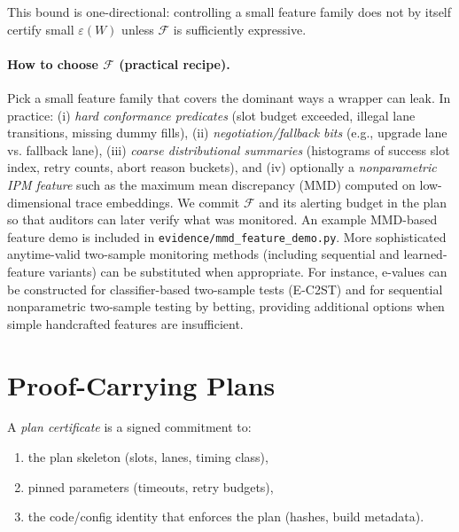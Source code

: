 \documentclass[11pt]{article}
\begin{document}
This bound is one-directional: controlling a small feature family does not by itself certify small $\varepsilon(W)$ unless $\mathcal{F}$ is sufficiently expressive.

\paragraph{How to choose $\mathcal{F}$ (practical recipe).}
Pick a small feature family that covers the dominant ways a wrapper can leak.
In practice: (i) \emph{hard conformance predicates} (slot budget exceeded, illegal lane transitions, missing dummy fills),
(ii) \emph{negotiation/fallback bits} (e.g., upgrade lane vs. fallback lane),
(iii) \emph{coarse distributional summaries} (histograms of success slot index, retry counts, abort reason buckets),
and (iv) optionally a \emph{nonparametric IPM feature} such as the maximum mean discrepancy (MMD) computed on low-dimensional trace embeddings.\cite{grettonKernelTwoSample2012,sriperumbudurIPM2012}
We commit $\mathcal{F}$ and its alerting budget in the plan so that auditors can later verify what was monitored. An example MMD-based feature demo is included in \texttt{evidence/mmd\_feature\_demo.py}. More sophisticated anytime-valid two-sample monitoring methods (including sequential and learned-feature variants) can be substituted when appropriate.\cite{pandevaDAVT2024}
For instance, e-values can be constructed for classifier-based two-sample tests (E-C2ST) and for sequential nonparametric two-sample testing by betting, providing additional options when simple handcrafted features are insufficient.\cite{pandevaEC2ST2024,podkopaevSequentialPredictive2023}


\section{Proof-Carrying Plans}
A \emph{plan certificate} is a signed commitment to:
\begin{enumerate}[leftmargin=*]
  \item the plan skeleton (slots, lanes, timing class),
  \item pinned parameters (timeouts, retry budgets),
  \item the code/config identity that enforces the plan (hashes, build metadata).
\end{enumerate}
\end{document}
